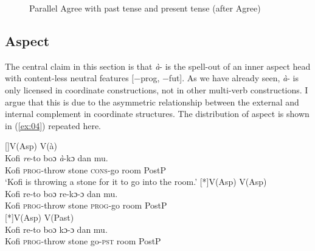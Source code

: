 \documentclass[output=paper,colorlinks,citecolor=brown]{langscibook}
\begin{document}
\begin{figure}[p]
\caption{\label{ex36a2}Parallel Agree with past tense and present tense (after Agree)}
\end{figure}


\subsection{Aspect}\label{sec:owusu:4.2}
The central claim in this section is that \emph{à}- is the spell-out of an inner aspect head with content-less neutral features [−prog, −fut]. As we have already seen, \emph{à}- is only licensed in coordinate constructions, not in other multi-verb constructions. I argue that this is due to the asymmetric relationship between the external and internal complement in coordinate structures. The distribution of aspect is shown in (\ref{ex:04}) repeated here.

\begin{exe}
[]{V(Asp) \phantom {} {} {} V(à)\\
\gll Kofi \textit{re}-to boɔ \textit{à}-kɔ dan mu.\\
	Kofi \textsc{prog}-throw stone \textsc{cons}-go room  PostP\\
\glt `Kofi is throwing a stone for it to go into the room.'}
[*]{V(Asp)\phantom {} {} {}   V(Asp)\\
\gll  Kofi re-to boɔ re-kɔ-ɔ dan mu.\\
	  Kofi \textsc{prog}-throw  stone  \textsc{prog}-go room PostP\\} 
[*]{V(Asp)\phantom {} {} {}   V(Past)\\
\gll Kofi re-to boɔ kɔ-ɔ dan mu.\\
	 Kofi \textsc{prog}-throw  stone  go-\textsc{pst} room PostP\\}
\end{exe}
\end{document}
